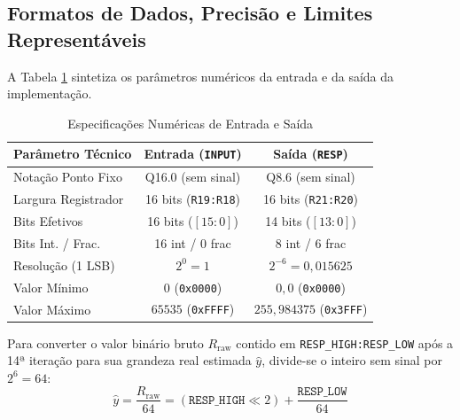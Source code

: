\documentclass[conference]{IEEEtran}
\begin{document}
\subsection{Formatos de Dados, Precisão e Limites Representáveis}
A Tabela \ref{tab:limites} sintetiza os parâmetros numéricos da entrada e da saída da implementação.

\begin{table}[htbp]
	\caption{Especificações Numéricas de Entrada e Saída}
	\label{tab:limites}
	\centering
	\footnotesize
	\setlength{\tabcolsep}{3.5pt}
	\begin{tabularx}{\columnwidth}{@{}Xcc@{}}
		\toprule
		\textbf{Parâmetro Técnico} & \textbf{Entrada (\texttt{INPUT})} & \textbf{Saída (\texttt{RESP})}   \\
		\midrule
		Notação Ponto Fixo         & Q16.0 (sem sinal)                 & Q8.6 (sem sinal)                 \\
		Largura Registrador        & 16 bits (\texttt{R19:R18})        & 16 bits (\texttt{R21:R20})       \\
		Bits Efetivos              & 16 bits ($[15:0]$)                & 14 bits ($[13:0]$)               \\
		Bits Int. / Frac.          & 16 int / 0 frac                   & 8 int / 6 frac                   \\
		Resolução (1 LSB)          & $2^0 = 1$                         & $2^{-6} = 0{,}015625$            \\
		Valor Mínimo               & $0$ (\texttt{0x0000})             & $0{,}0$ (\texttt{0x0000})        \\
		Valor Máximo               & $65535$ (\texttt{0xFFFF})         & $255{,}984375$ (\texttt{0x3FFF}) \\
		\bottomrule
	\end{tabularx}
\end{table}

Para converter o valor binário bruto $R_{\text{raw}}$ contido em \texttt{RESP\_HIGH:RESP\_LOW} após a 14ª iteração para sua grandeza real estimada $\hat{y}$, divide-se o inteiro sem sinal por $2^6 = 64$:
\begin{equation}
	\hat{y} = \frac{R_{\text{raw}}}{64} = (\texttt{RESP\_HIGH} \ll 2) + \frac{\texttt{RESP\_LOW}}{64}
	\label{eq:conversao}
\end{equation}
\end{document}
